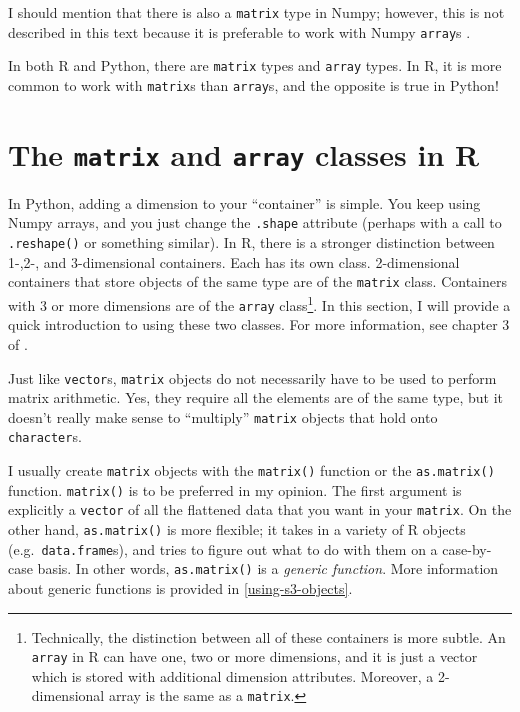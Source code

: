 \documentclass[12pt,krantz2]{krantz}
\begin{document}
I should mention that there is also a \texttt{matrix} type in Numpy; however, this is not described in this text because it is preferable to work with Numpy \texttt{array}s \citep{ml_with_python_cookbook}.

\begin{rmd-details}
In both R and Python, there are \texttt{matrix} types and \texttt{array} types. In R, it is more common to work with \texttt{matrix}s than \texttt{array}s, and the opposite is true in Python!

\end{rmd-details}

\hypertarget{the-matrix-and-array-classes-in-r}{%
\section{\texorpdfstring{The \texttt{matrix} and \texttt{array} classes in R}{The matrix and array classes in R}}\label{the-matrix-and-array-classes-in-r}}

In Python, adding a dimension to your ``container'' is simple. You keep using Numpy arrays, and you just change the \texttt{.shape} attribute (perhaps with a call to \texttt{.reshape()} or something similar). In R, there is a stronger distinction between 1-,2-, and 3-dimensional containers. Each has its own class. 2-dimensional containers that store objects of the same type are of the \texttt{matrix} class. Containers with 3 or more dimensions are of the \texttt{array} class\footnote{Technically, the distinction between all of these containers is more subtle. An \texttt{array} in R can have one, two or more dimensions, and it is just a vector which is stored with additional dimension attributes. Moreover, a 2-dimensional array is the same as a \texttt{matrix}.}. In this section, I will provide a quick introduction to using these two classes. For more information, see chapter 3 of \citep{matloff_r_book}.

\begin{rmd-caution}
Just like \texttt{vector}s, \texttt{matrix} objects do not necessarily have to be used to perform matrix arithmetic. Yes, they require all the elements are of the same type, but it doesn't really make sense to ``multiply'' \texttt{matrix} objects that hold onto \texttt{character}s.

\end{rmd-caution}

I usually create \texttt{matrix} objects with the \texttt{matrix()} function or the \texttt{as.matrix()} function. \texttt{matrix()} is to be preferred in my opinion. The first argument is explicitly a \texttt{vector} of all the flattened data that you want in your \texttt{matrix}. On the other hand, \texttt{as.matrix()} is more flexible; it takes in a variety of R objects (e.g.~\texttt{data.frame}s), and tries to figure out what to do with them on a case-by-case basis. In other words, \texttt{as.matrix()} is a \emph{generic function}. More information about generic functions is provided in \ref{using-s3-objects}.
\end{document}
